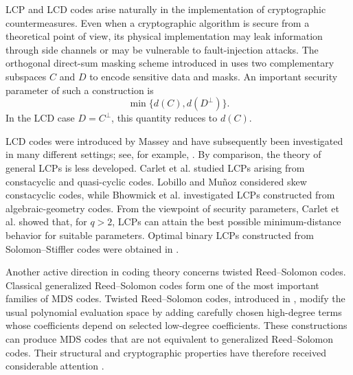 \documentclass[12pt,draftcls,journal,onecolumn]{IEEEtran}
\newcommand{\F}{{\mathbb{F}}}
\begin{document}


LCP and LCD codes arise naturally in the implementation of cryptographic countermeasures. Even when a cryptographic algorithm is secure from a theoretical point of view, its physical implementation may leak information through side channels or may be vulnerable to fault-injection attacks. The orthogonal direct-sum masking scheme introduced in \cite{Bringer2014,CarletGuilley2016} uses two complementary subspaces $C$ and $D$ to encode sensitive data and masks. An important security parameter of such a construction is
\[
\min\{d(C),d(D^\perp)\}.
\]
In the LCD case $D=C^\perp$, this quantity reduces to $d(C)$.

LCD codes were introduced by Massey \cite{Massey1992} and have subsequently been investigated in many different settings; see, for example, \cite{CarletEtAl2018LCD,EsmaeiliYari2009,GalindoEtAl2019,WuLee2020,ZhouEtAl2019}. By comparison, the theory of general LCPs is less developed. Carlet et al. \cite{CarletEtAl2018LCP} studied LCPs arising from constacyclic and quasi-cyclic codes. Lobillo and Mu\~noz \cite{LobilloMunoz2023} considered skew constacyclic codes, while Bhowmick et al. \cite{Bhowmick2023} investigated LCPs constructed from algebraic-geometry codes. From the viewpoint of security parameters, Carlet et al. \cite{CarletEtAl2019Sigma} showed that, for $q>2$, LCPs can attain the best possible minimum-distance behavior for suitable parameters. Optimal binary LCPs constructed from Solomon--Stiffler codes were obtained in \cite{Guneri2023}.

Another active direction in coding theory concerns twisted Reed--Solomon codes. Classical generalized Reed--Solomon codes form one of the most important families of MDS codes. Twisted Reed--Solomon codes, introduced in \cite{BeelenPuchingerRosenkilde2022}, modify the usual polynomial evaluation space by adding carefully chosen high-degree terms whose coefficients depend on selected low-degree coefficients. These constructions can produce MDS codes that are not equivalent to generalized Reed--Solomon codes. Their structural and cryptographic properties have therefore received considerable attention \cite{BeelenEtAl2018,HuangYueNiu2023,LiuLiu2021,LavauzelleRenner2020,ZhangZhouTang2022,ZhuLiao2021}.
\end{document}
